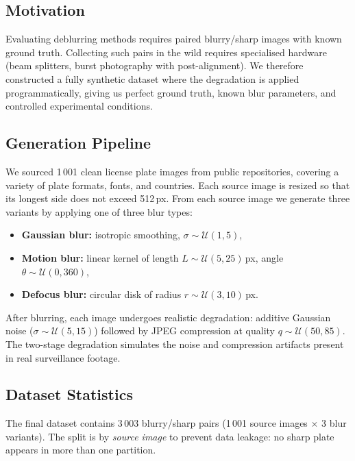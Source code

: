 \documentclass[12pt,a4paper]{article}
\begin{document}
\subsection{Motivation}

Evaluating deblurring methods requires paired blurry/sharp images with
known ground truth. Collecting such pairs in the wild requires
specialised hardware (beam splitters, burst photography with
post-alignment). We therefore constructed a fully synthetic dataset
where the degradation is applied programmatically, giving us perfect
ground truth, known blur parameters, and controlled experimental
conditions.

\subsection{Generation Pipeline}

We sourced 1\,001 clean license plate images from public repositories,
covering a variety of plate formats, fonts, and countries. Each source
image is resized so that its longest side does not exceed 512\,px. From
each source image we generate three variants by applying one of three
blur types:

\begin{itemize}[nosep]
  \item \textbf{Gaussian blur:} isotropic smoothing, $\sigma \sim \mathcal{U}(1, 5)$,
  \item \textbf{Motion blur:} linear kernel of length $L \sim \mathcal{U}(5, 25)$\,px, angle $\theta \sim \mathcal{U}(0, 360)$\textdegree,
  \item \textbf{Defocus blur:} circular disk of radius $r \sim \mathcal{U}(3, 10)$\,px.
\end{itemize}

After blurring, each image undergoes realistic degradation: additive
Gaussian noise ($\sigma \sim \mathcal{U}(5, 15)$) followed by JPEG
compression at quality $q \sim \mathcal{U}(50, 85)$. The two-stage
degradation simulates the noise and compression artifacts present in
real surveillance footage.

\subsection{Dataset Statistics}

The final dataset contains 3\,003 blurry/sharp pairs (1\,001 source
images $\times$ 3 blur variants). The split is by \textit{source image}
to prevent data leakage: no sharp plate appears in more than one
partition.
\end{document}
